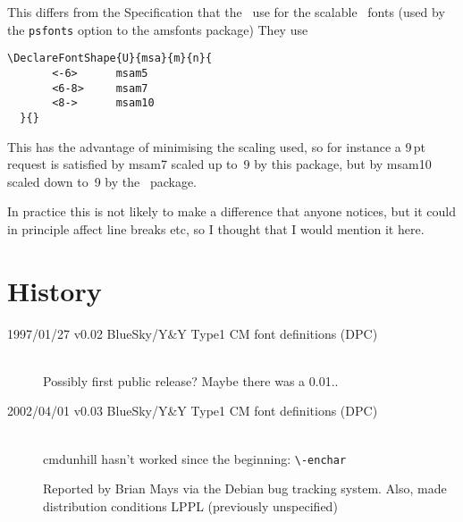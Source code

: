 \documentclass[pagesize=auto]{scrartcl}
\makeatletter
\newcommand*{\pkg}[1]{\textsf{#1}}
\newcommand*{\cs}[1]{\texttt{\textbackslash#1}}
\newcommand*{\cmd}[1]{\cs{\expandafter\@gobble\string#1}}
\newcommand*{\opt}[1]{\texttt{#1}}
\makeatother
\begin{document}
This differs from the Specification that the \AmS\ use for the scalable
\AmS\ fonts (used by the \opt{psfonts} option to the \pkg{amsfonts} package)
They use
%
\begin{lstlisting}
\DeclareFontShape{U}{msa}{m}{n}{
       <-6>      msam5 
       <6-8>     msam7 
       <8->      msam10
  }{}
\end{lstlisting}
%
This has the advantage of minimising the scaling used, so for instance
a 9\,pt request is satisfied by \textsf{msam7} scaled up to~9 by this package, but
by \textsf{msam10} scaled down to~9 by the \AmS\ package.

In practice this is not likely to make a difference that anyone notices,
but it could in principle affect line breaks etc, so I thought that
I would mention it here.

\clearpage


\section{History}

\begin{description}
\item[1997/01/27 v0.02 BlueSky/Y\&Y Type1 CM font definitions (DPC)] \leavevmode \\
  Possibly first public release? Maybe there was a 0.01..

\item[2002/04/01 v0.03 BlueSky/Y\&Y Type1 CM font definitions (DPC)] \leavevmode \\
  \textsf{cmdunhill} hasn't worked since the beginning: \cmd{\hyp\clap{\raisebox{-1.9ex}{\rmfamily\textuparrow}}enchar}

  Reported by Brian Mays via the Debian bug tracking system.
  Also, made distribution conditions LPPL (previously unspecified)
\end{description}
\end{document}
